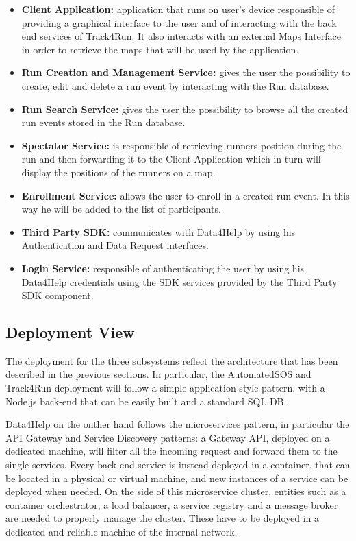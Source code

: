 \begin{itemize}
	\item \textbf{Client Application:} application that runs on user's device responsible of providing a graphical interface to the user and of interacting with the back end services of Track4Run. It also interacts with an external Maps Interface in order to retrieve the maps that will be used by the application.
	\item \textbf{Run Creation and Management Service:} gives the user the possibility to create, edit and delete a run event by interacting with the Run database.
	\item \textbf{Run Search Service:} gives the user the possibility to browse all the created run events stored in the Run database.
	\item \textbf{Spectator Service:} is responsible of retrieving runners position during the run and then forwarding it to the Client Application which in turn will display the positions of the runners on a map.
	\item \textbf{Enrollment Service:} allows the user to enroll in a created run event. In this way he will be added to the list of participants.
	\item \textbf{Third Party SDK:} communicates with Data4Help by using his Authentication and Data Request interfaces.
	\item \textbf{Login Service:} responsible of authenticating the user by using his Data4Help credentials using the SDK services provided by the Third Party SDK component.
\end{itemize}


\subsection{Deployment View}

The deployment for the three subsystems reflect the architecture that has been described in the previous sections. In particular, the AutomatedSOS and Track4Run deployment will follow a simple application-style pattern, with a Node.js back-end that can be easily built and a standard SQL DB.

Data4Help on the onther hand follows the microservices pattern, in particular the API Gateway and Service Discovery patterns: a Gateway API, deployed on a dedicated machine, will filter all the incoming request and forward them to the single services. Every back-end service is instead deployed in a container, that can be located in a physical or virtual machine, and new instances of a service can be deployed when needed. On the side of this microservice cluster, entities such as a container orchestrator, a load balancer, a service registry and a message broker are needed to properly manage the cluster. These have to be deployed in a dedicated and reliable machine of the internal network.

